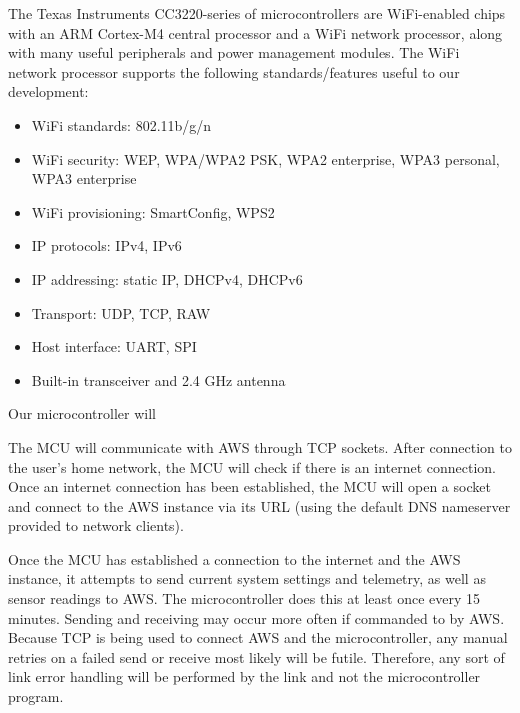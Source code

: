 \begin{flushleft}
    The Texas Instruments CC3220-series of microcontrollers are WiFi-enabled
    chips with an ARM Cortex-M4 central processor and a WiFi network processor,
    along with many useful peripherals and power management modules. The WiFi
    network processor supports the following standards/features useful to our
    development:
    \begin{itemize}
        \item WiFi standards: 802.11b/g/n
        \item WiFi security: WEP, WPA/WPA2 PSK, WPA2 enterprise, WPA3 personal,
        WPA3 enterprise
        \item WiFi provisioning: SmartConfig, WPS2
        \item IP protocols: IPv4, IPv6
        \item IP addressing: static IP, DHCPv4, DHCPv6
        \item Transport: UDP, TCP, RAW
        \item Host interface: UART, SPI
        \item Built-in transceiver and 2.4 GHz antenna
    \end{itemize}
    Our microcontroller will 
\end{flushleft}
\begin{flushleft}
    The MCU will communicate with AWS through TCP sockets. After connection to
    the user's home network, the MCU will check if there is an internet
    connection. Once an internet connection has been established, the MCU will
    open a socket and connect to the AWS instance via its URL (using the
    default DNS nameserver provided to network clients).
\end{flushleft}
\begin{flushleft}
    Once the MCU has established a connection to the internet and the AWS
    instance, it attempts to send current system settings and telemetry, as
    well as sensor readings to AWS. The microcontroller does this at least
    once every 15 minutes. Sending and receiving may occur more often if
    commanded to by AWS. Because TCP is being used to connect AWS and the
    microcontroller, any manual retries on a failed send or receive most
    likely will be futile. Therefore, any sort of link error handling will
    be performed by the link and not the microcontroller program.
\end{flushleft}
